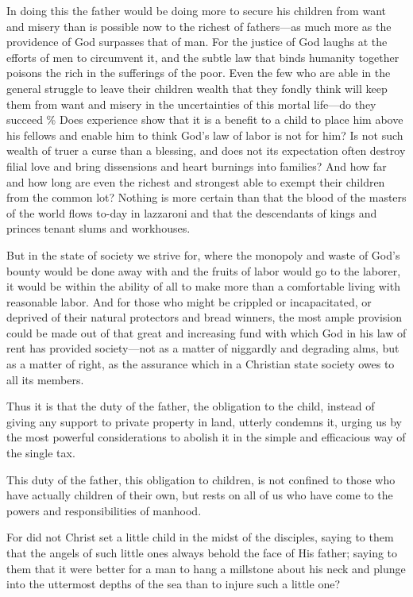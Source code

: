 \documentclass{book}
\begin{document}
In doing this the father would be doing more to secure his children from want and misery than is possible now to the richest of fathers—as much more as the providence of God surpasses that of man. For the justice of God laughs at the efforts of men to circumvent it, and the subtle law that binds humanity together poisons the rich in the sufferings of the poor. Even the few who are able in the general struggle to leave their children wealth that they fondly think will keep them from want and misery in the uncertainties of this mortal life—do they succeed \% Does experience show that it is a benefit to a child to place him above his fellows and enable him to think God’s law of labor is not for him? Is not such wealth of truer a curse than a blessing, and does not its expectation often destroy filial love and bring dissensions and heart burnings into families? And how far and how long are even the richest and strongest able to exempt their children from the common lot? Nothing is more certain than that the blood of the masters of the world flows to-day in lazzaroni and that the descendants of kings and princes tenant slums and workhouses.

But in the state of society we strive for, where the monopoly and waste of God’s bounty would be done away with and the fruits of labor would go to the laborer, it would be within the ability of all to make more than a comfortable living with reasonable labor. And for those who might be crippled or incapacitated, or deprived of their natural protectors and bread winners, the most ample provision could be made out of that great and increasing fund with which God in his law of rent has provided society—not as a matter of niggardly and degrading alms, but as a matter of right, as the assurance which in a Christian state society owes to all its members.

Thus it is that the duty of the father, the obligation to the child, instead of giving any support to private property in land, utterly condemns it, urging us by the most powerful considerations to abolish it in the simple and efficacious way of the single tax.

This duty of the father, this obligation to children, is not confined to those who have actually children of their own, but rests on all of us who have come to the powers and responsibilities of manhood.

For did not Christ set a little child in the midst of the disciples, saying to them that the angels of such little ones always behold the face of His father; saying to them that it were better for a man to hang a millstone about his neck and plunge into the uttermost depths of the sea than to injure such a little one?
\end{document}
